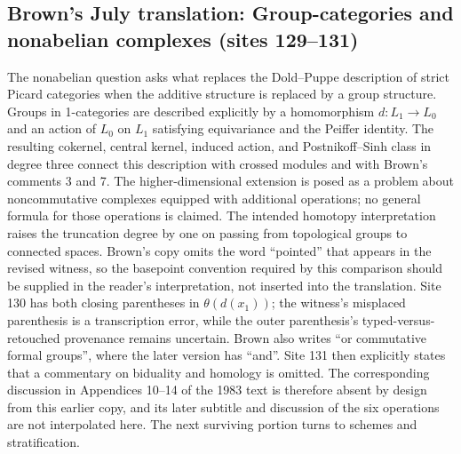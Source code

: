 \subsection*{Brown's July translation: Group-categories and nonabelian complexes (sites 129--131)}
The nonabelian question asks what replaces the Dold--Puppe description of strict Picard categories when the additive structure is replaced by a group structure. Groups in 1-categories are described explicitly by a homomorphism $d:L_1\to L_0$ and an action of $L_0$ on $L_1$ satisfying equivariance and the Peiffer identity. The resulting cokernel, central kernel, induced action, and Postnikoff--Sinh class in degree three connect this description with crossed modules and with Brown's comments 3 and 7. The higher-dimensional extension is posed as a problem about noncommutative complexes equipped with additional operations; no general formula for those operations is claimed. The intended homotopy interpretation raises the truncation degree by one on passing from topological groups to connected spaces. Brown's copy omits the word ``pointed'' that appears in the revised witness, so the basepoint convention required by this comparison should be supplied in the reader's interpretation, not inserted into the translation. Site 130 has both closing parentheses in $\theta(d(x_1))$; the witness's misplaced parenthesis is a transcription error, while the outer parenthesis's typed-versus-retouched provenance remains uncertain. Brown also writes ``or commutative formal groups'', where the later version has ``and''. Site 131 then explicitly states that a commentary on biduality and homology is omitted. The corresponding discussion in Appendices 10--14 of the 1983 text is therefore absent by design from this earlier copy, and its later subtitle and discussion of the six operations are not interpolated here. The next surviving portion turns to schemes and stratification.


